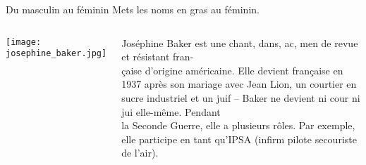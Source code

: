\begin{frame}{Du masculin au féminin}
  Mets les noms \alert{en gras} au féminin.
  \vspace{0.5cm}
  \begin{columns}
      \begin{center}
        \texttt{[image: josephine\_baker.jpg]}
      \end{center}
      Joséphine Baker est une \alert{chant\only<-1>{eur}\only<2->{\textcolor{red}{euse}}}, \alert{dans}, \alert{ac}, \alert{men} de revue et \alert{résistant} fran-\\çaise d'origine américaine.
      Elle devient française en 1937 après son mariage avec Jean Lion, un courtier en sucre industriel et un juif -- Baker ne devient ni \alert{cour} ni \alert{jui} elle-même.
      Pendant\\la Seconde Guerre, elle a plusieurs rôles.
      Par exemple, elle participe en tant qu'IPSA (\alert{infirm} pilote secouriste de l'air).
      
  \end{columns}
\end{frame}